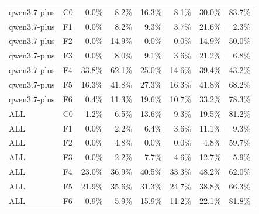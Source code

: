 \begin{tabular}{llrrrrrr}
qwen3.7-plus & C0 & 0.0\% & 8.2\% & 16.3\% & 8.1\% & 30.0\% & 83.7\% \\
qwen3.7-plus & F1 & 0.0\% & 8.2\% & 9.3\% & 3.7\% & 21.6\% & 2.3\% \\
qwen3.7-plus & F2 & 0.0\% & 14.9\% & 0.0\% & 0.0\% & 14.9\% & 50.0\% \\
qwen3.7-plus & F3 & 0.0\% & 8.0\% & 9.1\% & 3.6\% & 21.2\% & 6.8\% \\
qwen3.7-plus & F4 & 33.8\% & 62.1\% & 25.0\% & 14.6\% & 39.4\% & 43.2\% \\
qwen3.7-plus & F5 & 16.3\% & 41.8\% & 27.3\% & 16.3\% & 41.8\% & 68.2\% \\
qwen3.7-plus & F6 & 0.4\% & 11.3\% & 19.6\% & 10.7\% & 33.2\% & 78.3\% \\
ALL & C0 & 1.2\% & 6.5\% & 13.6\% & 9.3\% & 19.5\% & 81.2\% \\
ALL & F1 & 0.0\% & 2.2\% & 6.4\% & 3.6\% & 11.1\% & 9.3\% \\
ALL & F2 & 0.0\% & 4.8\% & 0.0\% & 0.0\% & 4.8\% & 59.7\% \\
ALL & F3 & 0.0\% & 2.2\% & 7.7\% & 4.6\% & 12.7\% & 5.9\% \\
ALL & F4 & 23.0\% & 36.9\% & 40.5\% & 33.3\% & 48.2\% & 62.0\% \\
ALL & F5 & 21.9\% & 35.6\% & 31.3\% & 24.7\% & 38.8\% & 66.3\% \\
ALL & F6 & 0.9\% & 5.9\% & 15.9\% & 11.2\% & 22.1\% & 81.8\% \\
\bottomrule
\end{tabular}

